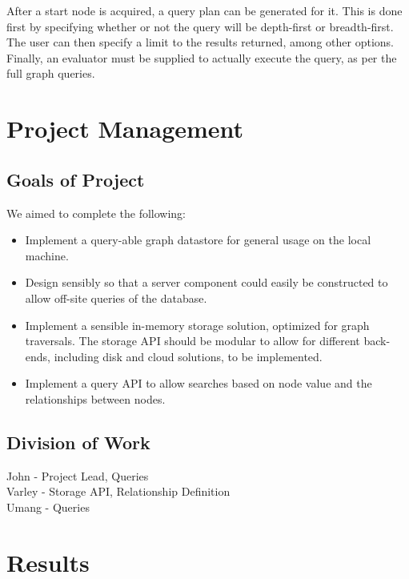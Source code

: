 \documentclass[11pt]{article}
\begin{document}
After a start node is acquired, a query plan can be generated for it. This is done first by specifying whether or not the query will be depth-first or breadth-first. The user can then specify a limit to the results returned, among other options. Finally, an evaluator must be supplied to actually execute the query, as per the full graph queries.

\section{Project Management}

\subsection{Goals of Project}
We aimed to complete the following:

\begin{itemize}
\item Implement a query-able graph datastore for general usage on the local machine.
\item Design sensibly so that a server component could easily be constructed to allow off-site queries of the database.
\item Implement a sensible in-memory storage solution, optimized for graph traversals. The storage API should be modular to allow for different back-ends, including disk and cloud solutions, to be implemented.
\item Implement a query API to allow searches based on node value and the relationships between nodes.
\end{itemize}

\subsection{Division of Work}

John - Project Lead, Queries \\
Varley - Storage API, Relationship Definition\\
Umang -  Queries \\

\section{Results}




\end{document}
